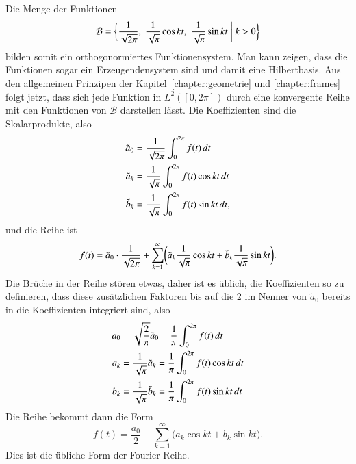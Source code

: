 Die Menge der Funktionen
\[
\mathcal{B}
=
\biggl\{
\biggl.
\frac1{\sqrt{2\pi}}, \;
\frac1{\sqrt{\pi\mathstrut}} \cos kt,\;
\frac1{\sqrt{\pi\mathstrut}} \sin kt
\;
\biggr|
\;
k>0
\biggr\}
\]
bilden somit ein orthogonormiertes Funktionensystem.
Man kann zeigen, dass die Funktionen sogar ein Erzeugendensystem sind
und damit eine Hilbertbasis.
Aus den allgemeinen Prinzipen der Kapitel~\ref{chapter:geometrie} und
\ref{chapter:frames} folgt jetzt, dass sich jede Funktion in $L^2([0,2\pi])$
durch eine konvergente Reihe
mit den Funktionen von $\mathcal{B}$ darstellen lässt.
Die Koeffizienten sind die Skalarprodukte, also
\begin{align*}
\tilde{a}_0
&=
\frac{1}{\sqrt{2\pi}}
\int_0^{2\pi} f(t)\,dt
\\
\tilde{a}_k 
&=
\frac{1}{\sqrt{\pi\mathstrut}}
\int_0^{2\pi} f(t) \cos kt\,dt
\\
\tilde{b}_k 
&=
\frac{1}{\sqrt{\pi\mathstrut}}
\int_0^{2\pi} f(t) \sin kt\,dt,
\end{align*}
und die Reihe ist
\[
f(t)
=
\tilde{a}_0 \cdot \frac1{\sqrt{2\pi}}
+
\sum_{k=1}^\infty\biggl(
\tilde{a}_k \frac1{\sqrt{\pi\mathstrut}} \cos kt
+
\tilde{b}_k \frac1{\sqrt{\pi\mathstrut}} \sin kt
\biggr).
\]
Die Brüche in der Reihe stören etwas, daher ist es üblich, die Koeffizienten
so zu definieren, dass diese zusätzlichen Faktoren bis auf die $2$ im
Nenner von $\tilde{a}_0$ bereits in die Koeffizienten integriert sind, also
\begin{align*}
a_0
&=
\sqrt{\frac{2}{\pi}}
\tilde{a}_0
=
\frac1{\pi\mathstrut} \int_0^{2\pi} f(t)\,dt
\\
a_k
&=
\frac{1}{\sqrt{\pi\mathstrut}} \tilde{a}_k
=
\frac1{\pi\mathstrut} \int_0^{2\pi} f(t) \cos kt\,dt
\\
b_k
&=
\frac{1}{\sqrt{\pi\mathstrut}} \tilde{b}_k
=
\frac1{\pi\mathstrut} \int_0^{2\pi} f(t) \sin kt\,dt
\end{align*}
Die Reihe bekommt dann die Form
\[
f(t)
=
\frac{a_0}2
+
\sum_{k=1}^\infty \bigl( a_k \cos kt + b_k \sin kt \bigr).
\]
Dies ist die übliche Form der Fourier-Reihe.

